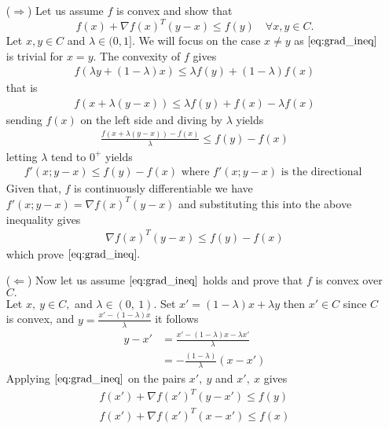 \documentclass{ExerciseSheet}
\newif\ifsolutions
\begin{document}
\ifsolutions
\vskip 0.3cm
\begin{solution}

\begin{itemize}
    \item [($\Rightarrow$)] Let us assume $f$ is convex and show that
    \begin{equation*}%
		f(x) +\nabla f(x)^T(y-x)\leq f(y) \quad \forall x, y\in C.
	\end{equation*}
 Let $x, y\in C$ and $\lambda \in (0, 1].$ We will focus on the case $x\neq y$ as $\eqref{eq:grad_ineq}$ is trivial for $x=y.$
 The convexity of $f$ gives
 \begin{align*}
     f\left(\lambda y + (1-\lambda)x\right) \leq \lambda f(y) + (1-\lambda)f(x)
 \end{align*}
that is 
  \begin{align*}
     f\left(x+\lambda (y-x)\right) \leq \lambda f(y) + f(x)-\lambda f(x)
 \end{align*}
sending $f(x)$ on the left side and diving by $\lambda$ yields
   \begin{align*}
     \frac{f\left(x+\lambda (y-x) \right) - f(x)}{\lambda}\leq f(y)- f(x)
 \end{align*}
letting $\lambda$ tend to $0^+$ yields
        \begin{align*}
     f'(x;y-x)\leq f(y)- f(x) \text{ where $f'(x;y-x)$ is the directional }
 \end{align*}
 Given that, $f$ is continuously differentiable we have $f'(x;y-x)=\nabla f(x)^T(y-x)$ and substituting this into the above inequality gives  
    \begin{align*}
     \nabla f(x)^T(y-x)\leq f(y)- f(x) 
 \end{align*}
which prove $\ref{eq:grad_ineq}.$
\item [($\Leftarrow$)] Now let us assume $\eqref{eq:grad_ineq}$ holds and prove that $f$ is convex over $C.$\\
Let $x,~y\in C,$ and $\lambda\in (0,~1).$ Set $x'=(1-\lambda)x+\lambda y$ then $x'\in C$ since $C$ is convex, and $y=\frac{x'-(1-\lambda)x}{\lambda}$ it follows
   \begin{align}
       y-x' &= \frac{x'-(1-\lambda)x-\lambda x'}{\lambda}\nonumber\\
            &=-\frac{(1-\lambda)}{\lambda}(x-x')   \label{y-x'}
   \end{align}
 Applying $\eqref{eq:grad_ineq}$ on the pairs $x',~y$ and $x',~x$ gives           
    \begin{align}
        f(x') +\nabla f(x')^T(y-x')\leq f(y) \label{intermediate step 1}\\
        f(x') +\nabla f(x')^T(x-x')\leq f(x)  \label{intermediate step 2}
    \end{align}


\end{itemize}
\end{solution}
\end{document}
